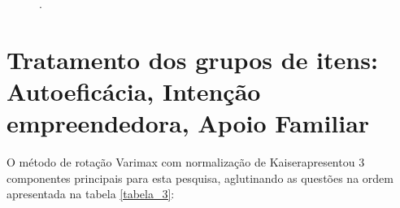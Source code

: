 \begin{figure}[!h]
\qquad
{}
.
\label{figura_29}
\end{figure}
\newpage



\section{Tratamento dos grupos de itens: Autoeficácia, Intenção empreendedora, Apoio Familiar}

O método de rotação Varimax com normalização de Kaiser\footnotemark[1] apresentou 3 componentes principais para esta pesquisa, aglutinando as questões na ordem apresentada na tabela \ref{tabela_3}:


